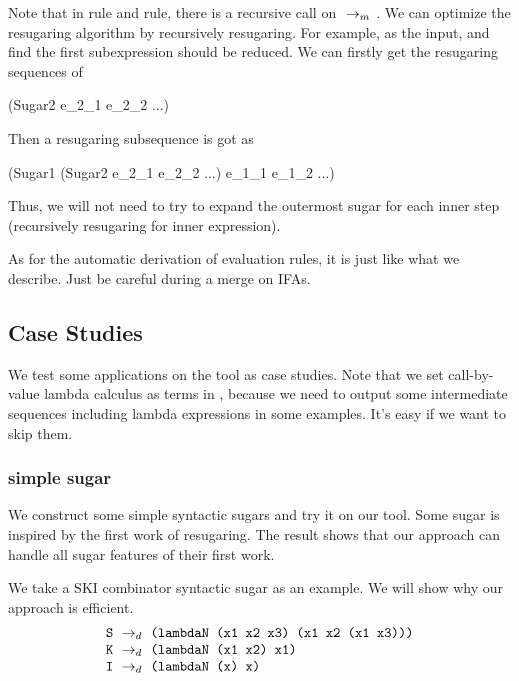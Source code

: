 \label{mark:optimize}
Note that in  rule and  rule, there is a recursive call on $~\rightarrow_m~$. We can optimize the resugaring algorithm by recursively resugaring. For example,  as the input, and find the first subexpression should be reduced. We can firstly get the resugaring sequences of 
\begin{Codes}
    (Sugar2 e_2_1 e_2_2 ...)
 
\end{Codes}
Then a resugaring subsequence is got as
\begin{Codes}
    (Sugar1 (Sugar2 e_2_1 e_2_2 ...) e_1_1 e_1_2 ...)
 
\end{Codes}
Thus, we will not need to try to expand the outermost sugar for each inner step (recursively resugaring for inner expression).

As for the automatic derivation of evaluation rules, it is just like what we describe. Just be careful during a merge on IFAs. 

\subsection{Case Studies}

We test some applications on the tool as case studies. Note that we set call-by-value lambda calculus as terms in , because we need to output some intermediate sequences including lambda expressions in some examples. It's easy if we want to skip them.

\subsubsection{simple sugar}
\label{mark:simple}

We construct some simple syntactic sugars and try it on our tool. Some sugar is inspired by the first work of resugaring\cite{resugaring}. The result shows that our approach can handle all sugar features of their first work.

We take a SKI combinator syntactic sugar as an example. We will show why our approach is efficient.
\[
\begin{array}{l}
\mbox{\tt S} ~\rightarrow_d~ \texttt{(lambdaN (x1 x2 x3) (x1 x2 (x1 x3)))}\\
\mbox{\tt K} ~\rightarrow_d~ \texttt{(lambdaN (x1 x2) x1)}\\
\mbox{\tt I} ~\rightarrow_d~ \texttt{(lambdaN (x) x)}
\end{array}
\]




